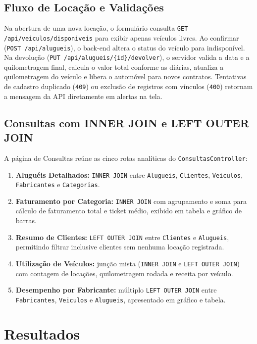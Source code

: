 \documentclass[12pt]{article}
\begin{document}
\subsection{Fluxo de Locação e Validações}

Na abertura de uma nova locação, o formulário consulta \texttt{GET /api/veiculos/disponiveis} para exibir apenas veículos livres. Ao confirmar (\texttt{POST /api/alugueis}), o back-end altera o status do veículo para indisponível. Na devolução (\texttt{PUT /api/alugueis/\{id\}/devolver}), o servidor valida a data e a quilometragem final, calcula o valor total conforme as diárias, atualiza a quilometragem do veículo e libera o automóvel para novos contratos. Tentativas de cadastro duplicado (\texttt{409}) ou exclusão de registros com vínculos (\texttt{400}) retornam a mensagem da API diretamente em alertas na tela.

\subsection{Consultas com INNER JOIN e LEFT OUTER JOIN}

A página de Consultas reúne as cinco rotas analíticas do \texttt{ConsultasController}:
\begin{enumerate}
  \item \textbf{Aluguéis Detalhados:} \texttt{INNER JOIN} entre \texttt{Alugueis}, \texttt{Clientes}, \texttt{Veiculos}, \texttt{Fabricantes} e \texttt{Categorias}.
  \item \textbf{Faturamento por Categoria:} \texttt{INNER JOIN} com agrupamento e soma para cálculo de faturamento total e ticket médio, exibido em tabela e gráfico de barras.
  \item \textbf{Resumo de Clientes:} \texttt{LEFT OUTER JOIN} entre \texttt{Clientes} e \texttt{Alugueis}, permitindo filtrar inclusive clientes sem nenhuma locação registrada.
  \item \textbf{Utilização de Veículos:} junção mista (\texttt{INNER JOIN} e \texttt{LEFT OUTER JOIN}) com contagem de locações, quilometragem rodada e receita por veículo.
  \item \textbf{Desempenho por Fabricante:} múltiplo \texttt{LEFT OUTER JOIN} entre \texttt{Fabricantes}, \texttt{Veiculos} e \texttt{Alugueis}, apresentado em gráfico e tabela.
\end{enumerate}

\section{Resultados}
\end{document}
